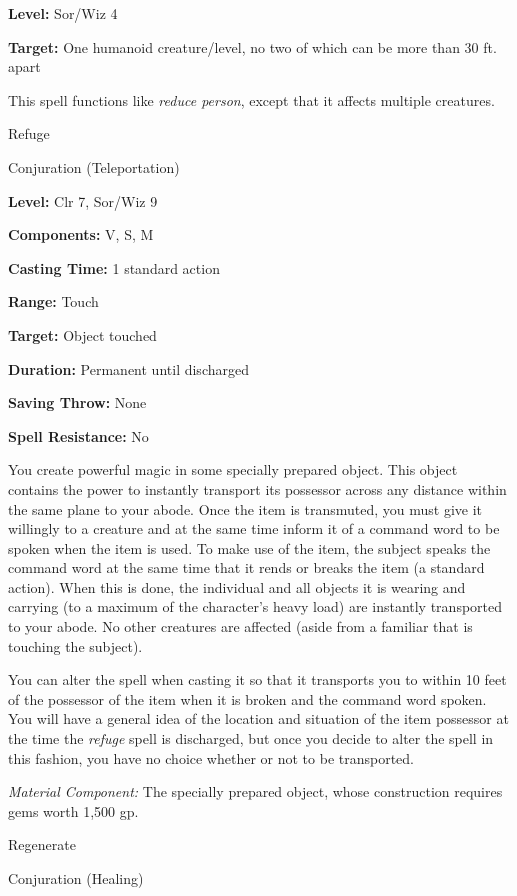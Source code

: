 \documentclass{article}
\begin{document}
\textbf{Level:} Sor/Wiz 4

\textbf{Target:} One humanoid creature/level, no two of which can be more than 
30 ft. apart

This spell functions like \textit{reduce person}, except that it affects multiple 
creatures.

\vspace{12pt}
Refuge

Conjuration (Teleportation)

\textbf{Level:} Clr 7, Sor/Wiz 9

\textbf{Components:} V, S, M

\textbf{Casting Time:} 1 standard action

\textbf{Range:} Touch

\textbf{Target:} Object touched

\textbf{Duration:} Permanent until discharged

\textbf{Saving Throw:} None

\textbf{Spell Resistance:} No

You create powerful magic in some specially prepared object. This object contains 
the power to instantly transport its possessor across any distance within the same 
plane to your abode. Once the item is transmuted, you must give it willingly to 
a creature and at the same time inform it of a command word to be spoken when the 
item is used. To make use of the item, the subject speaks the command word at the 
same time that it rends or breaks the item (a standard action). When this is done, 
the individual and all objects it is wearing and carrying (to a maximum of the 
character's heavy load) are instantly transported to your abode. No other creatures 
are affected (aside from a familiar that is touching the subject).

You can alter the spell when casting it so that it transports you to within 10 
feet of the possessor of the item when it is broken and the command word spoken. 
You will have a general idea of the location and situation of the item possessor 
at the time the \textit{refuge }spell is discharged, but once you decide to alter 
the spell in this fashion, you have no choice whether or not to be transported.

\textit{Material Component: }The specially prepared object, whose construction 
requires gems worth 1,500 gp.

\vspace{12pt}
Regenerate

Conjuration (Healing)
\end{document}
